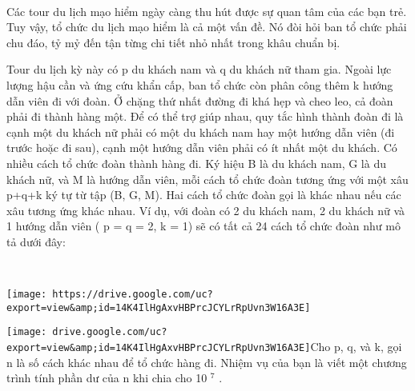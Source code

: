  

Các tour du lịch mạo hiểm ngày càng thu hút được sự quan tâm của các bạn trẻ. Tuy vậy, tổ chức du lịch mạo hiểm là cả một vấn đề. Nó đòi hỏi ban tổ chức phải chu đáo, tỷ mỷ đến tận từng chi tiết nhỏ nhất trong khâu chuẩn bị.

Tour du lịch kỳ này có p du khách nam và q du khách nữ tham gia. Ngoài lực lượng hậu cần và ứng cứu khẩn cấp, ban tổ chức còn phân công thêm k hướng dẫn viên đi với đoàn. Ở chặng thứ nhất đường đi khá hẹp và cheo leo, cả đoàn phải đi thành hàng một. Để có thể trợ giúp nhau, quy tắc hình thành đoàn đi là cạnh một du khách nữ phải có một du khách nam hay một hướng dẫn viên (đi trước hoặc đi sau), cạnh một hướng dẫn viên phải có ít nhất một du khách. Có nhiều cách tổ chức đoàn thành hàng đi. Ký hiệu B là du khách nam, G là du khách nữ, và M là hướng dẫn viên, mỗi cách tổ chức đoàn tương ứng với một xâu p+q+k ký tự từ tập (B, G, M). Hai cách tổ chức đoàn gọi là khác nhau nếu các xâu tương ứng khác nhau. Ví dụ, với đoàn có 2 du khách nam, 2 du khách nữ và 1 hướng dẫn viên ( p = q = 2, k = 1) sẽ có tất cả 24 cách tổ chức đoàn như mô tả dưới đây:

 


\texttt{[image: https://drive.google.com/uc?export=view\&amp;id=14K4IlHgAxvHBPrcJCYLrRpUvn3W16A3E]}


\texttt{[image: drive.google.com/uc?export=view\&amp;id=14K4IlHgAxvHBPrcJCYLrRpUvn3W16A3E]}Cho p, q, và k, gọi n là số cách khác nhau để tổ chức hàng đi. Nhiệm vụ của bạn là viết một chương trình tính phần dư của n khi chia cho 10 $^ 7 $ .

\